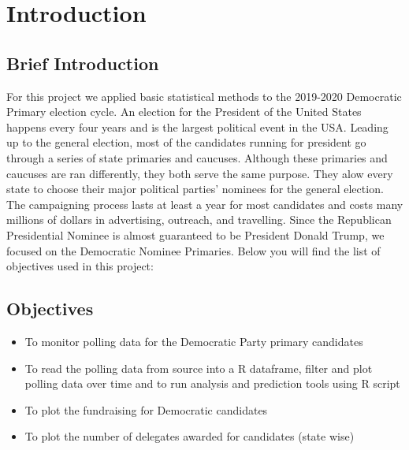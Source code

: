 \section{Introduction}
\subsection{Brief Introduction}
For this project we applied basic statistical methods to the 2019-2020 Democratic Primary election cycle. An election for the President of the United States happens every four years and is the largest political event in the USA. Leading up to the general election, most of the candidates running for president go through a series of state primaries and caucuses. Although these primaries and caucuses are ran differently, they both serve the same purpose. They alow every state to choose their major political parties’ nominees for the general election\cite{usagov}. The campaigning process lasts at least a year for most candidates and costs many millions of dollars in advertising, outreach, and travelling. Since the Republican Presidential Nominee is almost guaranteed to be President Donald Trump, we focused on the Democratic Nominee Primaries. Below you will find the list of objectives used in this project:

\subsection{Objectives}
\begin{itemize}
    \item To monitor polling data for the Democratic Party primary candidates
    \item To read the polling data from source into a R dataframe, filter and plot polling data over time and to run analysis and prediction tools using R script 
    \item To plot the fundraising for Democratic candidates
    \item To plot the number of delegates awarded for candidates (state wise)
\end{itemize}

